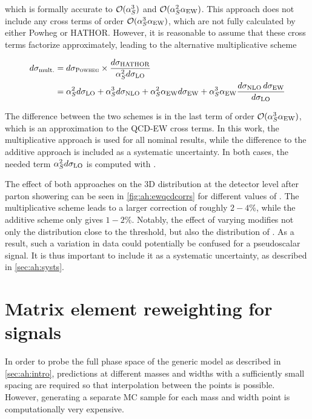 \noindent which is formally accurate to $\mathcal{O}(\alpha_S^3)$ and $\mathcal{O}(\alpha_S^2 \alpha_{\mathrm{EW}})$. This approach does not include any cross terms of order $\mathcal{O}(\alpha_S^3 \alpha_{\mathrm{EW}})$, which are not fully calculated by either Powheg or HATHOR. However, it is reasonable to assume that these cross terms factorize approximately, leading to the alternative multiplicative scheme~\cite{Kuhn:2013zoa}

\begin{equation}
\begin{split}
\label{eq:ah:ewmult}
    d \sigma_{\mathrm{mult.}} &= d \sigma_{\textsc{Powheg}} \times \frac{d \sigma_{\mathrm{HATHOR}}} {\alpha_S^2 d \sigma_{\mathrm{LO}}} \\
    &= \alpha_S^2 d \sigma_{\mathrm{LO}} + \alpha_S^3 d \sigma_{\mathrm{NLO}} + \alpha_S^2 \alpha_{\mathrm{EW}} d \sigma_{\mathrm{EW}} + \alpha_S^3 \alpha_{\mathrm{EW}} \frac {d \sigma_{\mathrm{NLO}} \, d \sigma_{\mathrm{EW}}}{d \sigma_{\mathrm{LO}}}
\end{split}
\end{equation}

The difference between the two schemes is in the last term of order $\mathcal{O}(\alpha_S^3\alpha_{\mathrm{EW}})$, which is an approximation to the QCD-EW cross terms. In this work, the multiplicative approach is used for all nominal results, while the difference to the additive approach is included as a systematic uncertainty. In both cases, the needed term $\alpha_S^2 d \sigma_{\mathrm{LO}}$ is computed with \amcatnlo.

The effect of both approaches on the 3D \mttchelchan distribution at the detector level after parton showering can be seen in \cref{fig:ah:ewqcdcorrs} for different values of \yt. The multiplicative scheme leads to a larger correction of roughly $2-4\%$, while the additive scheme only gives $1-2\%$. Notably, the effect of varying \yt modifies not only the \mtt distribution close to the \ttbar threshold, but also the distribution of \chel. As a result, such a variation in data could potentially be confused for a pseudoscalar signal. It is thus important to include it as a systematic uncertainty, as described in \cref{sec:ah:systs}.


\section{Matrix element reweighting for \AH signals}
\label{sec:ah:mereweighting}

In order to probe the full phase space of the generic \AH model as described in \cref{sec:ah:intro}, predictions at different \AH masses and widths with a sufficiently small spacing are required so that interpolation between the points is possible. However, generating a separate MC sample for each mass and width point is computationally very expensive.

